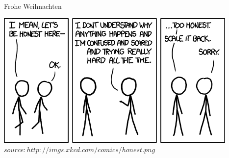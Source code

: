 		
	\begin{frame} {Frohe Weihnachten}
		\begin{center}
			\includegraphics[scale=0.65]{graphics/eof10.png}\\
			\tiny $source: http://imgs.xkcd.com/comics/honest.png$
		\end{center}
	\end{frame}


